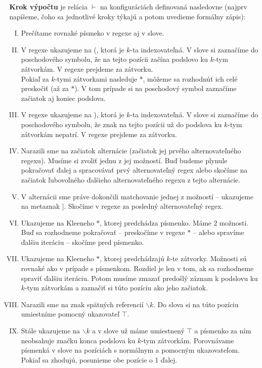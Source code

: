 \begin{df}
\textbf{Krok výpočtu} je relácia $\vdash$ na konfiguráciách definovaná nasledovne (najprv napíšeme, čoho sa jednotlivé kroky týkajú a potom uvedieme formálny zápis):

\begin{enumerate}[I.]
\item Prečítame rovnaké písmeko v regexe aj v slove.
\item V regexe ukazujeme na (, ktorá je $k$-ta indexovateľná. V slove si zaznačíme do poschodového symbolu, že na tejto pozícii začína podslovo ku $k$-tym zátvorkám. V regexe prejdeme za zátvorku.
\\ Pokiaľ za $k$-tymi zátvorkami nasleduje $*$, môžeme sa rozhodnúť ich celé preskočiť (až za $*$). V tom prípade si na poschodový symbol zaznačíme začiatok aj koniec podslova.
\item V regexe ukazujeme na ), ktorá je $k$-ta indexovateľná. V slove si zaznačíme do poschodového symbolu, že znak na tejto pozícii už do podslova ku $k$-tym zátvorkám nepatrí. V regexe prejdeme za zátvorku.
\item Narazili sme na začiatok alternácie (začiatok jej prvého alternovateľného regexu). Musíme si zvoliť jednu z jej možností. Buď budeme plynule pokračovať ďalej a spracovávať prvý alternovateľný regex alebo skočíme na začiatok ľubovoľného ďalšieho alternovateľného regexu z tejto alternácie.
\item V alternácii sme práve dokončili matchovanie jednej z možností -- ukazujeme na metaznak |. Skočíme v regexe za posledný alternovateľný regex.
\item Ukazujeme na Kleeneho $*$, ktorej predchádza písmenko. Máme 2 možnosti. Buď sa rozhodneme pokračovať -- preskočíme v regexe $*$ -- alebo spravíme ďalšiu iteráciu -- skočíme pred písmenko.
\item Ukazujeme na Kleeneho $*$, ktorej predchádzajú $k$-te zátvorky. Možnosti sú rovnaké ako v prípade s písmenkom. Rozdiel je len v tom, ak sa rozhodneme spraviť ďalšiu iteráciu. Potom musíme zmazať predošlý záznam k podslovu ku $k$-tym zátvorkám a zaznačiť si túto pozíciu ako jeho začiatok.
\item Narazili sme na znak spätných referencií $\backslash k$. Do slova si na túto pozíciu umiestníme pomocný ukazovateľ $\intercal$.
\item Stále ukazujeme na $\backslash k$ a v slove už máme umiestnený $\intercal$ a písmenko za ním neobsahuje značku konca podslova ku $k$-tym zátvorkám. Porovnávame písmenká v slove na pozíciách s normálnym a pomocným ukazovateľom. Pokiaľ sa zhodujú, posunieme obe pozície o 1 ďalej.

\end{enumerate}
\end{df}
